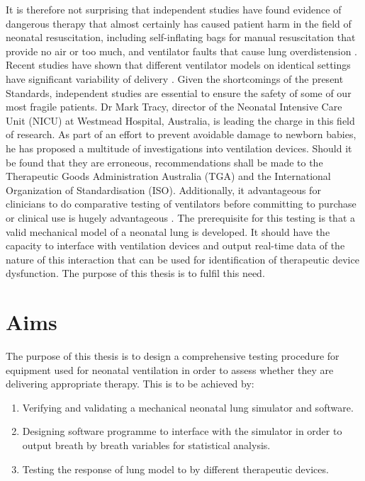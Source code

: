 \documentclass[12pt, openany, oneside]{book}
\begin{document}
It is therefore not surprising that independent studies have found evidence of dangerous therapy that almost certainly has caused patient harm in the field of neonatal resuscitation, including self-inflating bags for manual resuscitation that provide no air or too much, and ventilator faults that cause lung overdistension \citep{hinder2016, tracy2019newborn}. Recent studies have shown that different ventilator models on identical settings have significant variability of delivery \citep{krieger2017volume, itagaki2017effects}. Given the shortcomings of the present Standards, independent studies are essential to ensure the safety of some of our most fragile patients. Dr Mark Tracy, director of the Neonatal Intensive Care Unit (NICU) at Westmead Hospital, Australia, is leading the charge in this field of research. As part of an effort to prevent avoidable damage to newborn babies, he has proposed a multitude of investigations into ventilation devices. Should it be found that they are erroneous, recommendations shall be made to the Therapeutic Goods Administration Australia (TGA) and the International Organization of Standardisation (ISO). Additionally, it advantageous for clinicians to do comparative testing of ventilators before committing to purchase or clinical use is hugely advantageous \citep{murray}. The prerequisite for this testing is that a valid mechanical model of a neonatal lung is developed. It should have the capacity to interface with ventilation devices and output real-time data of the nature of this interaction that can be used for identification of therapeutic device dysfunction. The purpose of this thesis is to fulfil this need.



\section{Aims}
The purpose of this thesis is to design a comprehensive testing procedure for equipment used for neonatal ventilation in order to assess whether they are delivering appropriate therapy. This is to be achieved by:
\begin{enumerate}
\item{Verifying and validating a mechanical neonatal lung simulator and software.}
\item{Designing software programme to interface with the simulator in order to output breath by breath variables for statistical analysis.}
\item{Testing the response of lung model to by different therapeutic devices.}
\end{enumerate}
\end{document}
